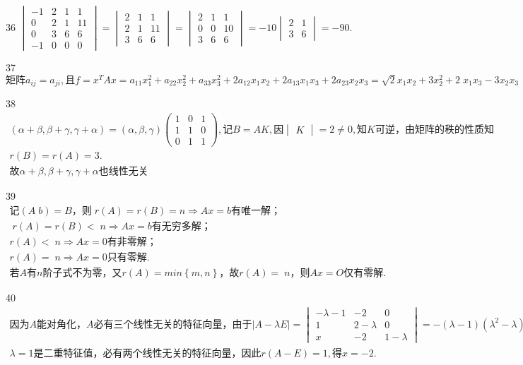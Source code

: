 36
$\begin{vmatrix}-1&2&1&1\\0&2&1&11\\0&3&6&6\\-1&0&0&0\end{vmatrix}=\begin{vmatrix}2&1&1\\2&1&11\\3&6&6\end{vmatrix}=\begin{vmatrix}2&1&1\\0&0&10\\3&6&6\end{vmatrix}=-10\begin{vmatrix}2&1\\3&6\end{vmatrix}=-90.$


37
$\mathrm{矩阵}a_{ij}=a_{ji},且f=x^TAx=a_{11}x_1^2+a_{22}x_2^2+a_{33}x_3^2+2a_{12}x_1x_2+2a_{13}x_1x_3+2a_{23}x_2x_3=\sqrt2x_1x_2+3x_2^2+2\;x_1x_3-3x_2x_3$


38
$\begin{array}{l}(\alpha+\beta,\beta+\gamma,\gamma+\alpha)=(\alpha,\beta,\gamma)\begin{pmatrix}1&0&1\\1&1&0\\0&1&1\end{pmatrix},记B=AK,因\begin{vmatrix}K\end{vmatrix}=2\neq0,知K\mathrm{可逆}，\mathrm{由矩阵的秩的性质知}\\r(B)=r(A)=3.\\故\alpha+\beta,\beta+\gamma,\gamma+\alpha\mathrm{也线性无关}\end{array}$


39
$\begin{array}{l}记\left(A\;b\right)=B，则\;r\left(A\right)=r\left(B\right)=n\Rightarrow Ax=b\mathrm{有唯一解}；\\\;r\left(A\right)=r\left(B\right)<\;n\Rightarrow Ax=b\mathrm{有无穷多解}；\;\;\\r\left(A\right)<\;n\Rightarrow Ax=0\mathrm{有非零解}；\\r\left(A\right)=\;n\Rightarrow Ax=0\mathrm{只有零解}.\;\;\\若A有n\mathrm{阶子式不为零}，又r\left(A\right)=min\left\{m,n\right\}，故r\left(A\right)=\;n，则Ax=O\mathrm{仅有零解}.\end{array}$


40
$\begin{array}{l}\mathrm{因为}A\mathrm{能对角化}，A\mathrm{必有三个线性无关的特征向量}，\mathrm{由于}\left|A-\lambda E\right|=\begin{vmatrix}-\lambda-1&-2&0\\1&2-\lambda&0\\x&-2&1-\lambda\end{vmatrix}=-(\lambda-1)(\lambda^2-\lambda)\\\lambda=1\mathrm{是二重特征值}，\mathrm{必有两个线性无关的特征向量}，\mathrm{因此}r(A-E)=1,得x=-2.\end{array}$


